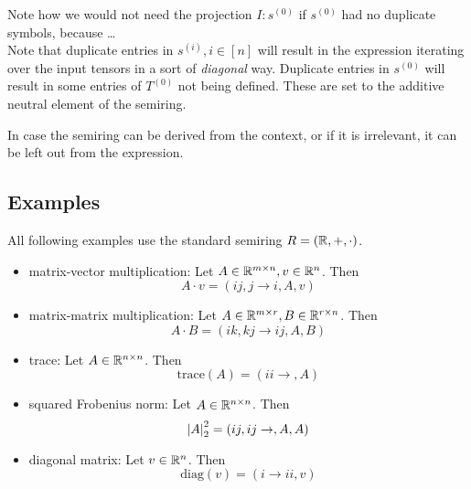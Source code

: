 \begin{definition}
    Note how we would not need the projection $I:s^{(0)}$ if $s^{(0)}$ had no duplicate symbols, because \dots\\
    Note that duplicate entries in $s^{(i)}, i \in [n]$ will result in the expression iterating over the input tensors in a sort of \textit{diagonal} way.
    Duplicate entries in $s^{(0)}$ will result in some entries of $T^{(0)}$ not being defined. These are set to the additive neutral element of the semiring.

    In case the semiring can be derived from the context, or if it is irrelevant, it can be left out from the expression.
\end{definition}

\subsection{Examples}
All following examples use the standard semiring $R = (\mathbb{R}, +, \cdot)$.
\begin{itemize}
    \item matrix-vector multiplication: Let $A \in \mathbb{R}^{m \times n}, v \in \mathbb{R}^{n}$. Then
          $$A \cdot v = (ij, j \rightarrow i, A, v)$$
    \item matrix-matrix multiplication: Let $A \in \mathbb{R}^{m \times r}, B \in \mathbb{R}^{r \times n}$. Then
          $$A \cdot B = (ik, kj \rightarrow ij, A, B)$$
    \item trace: Let $A \in \mathbb{R}^{n \times n}$. Then
          $$\text{trace}(A) = (ii \rightarrow, A)$$
    \item squared Frobenius norm: Let $A \in \mathbb{R}^{n \times n}$. Then
          $$\left| A \right|_2^2 = (ij, ij \rightarrow,A,A)$$
    \item diagonal matrix: Let $v \in \mathbb{R}^{n}$. Then
          $$\text{diag}(v) = (i \rightarrow ii, v)$$
\end{itemize}

